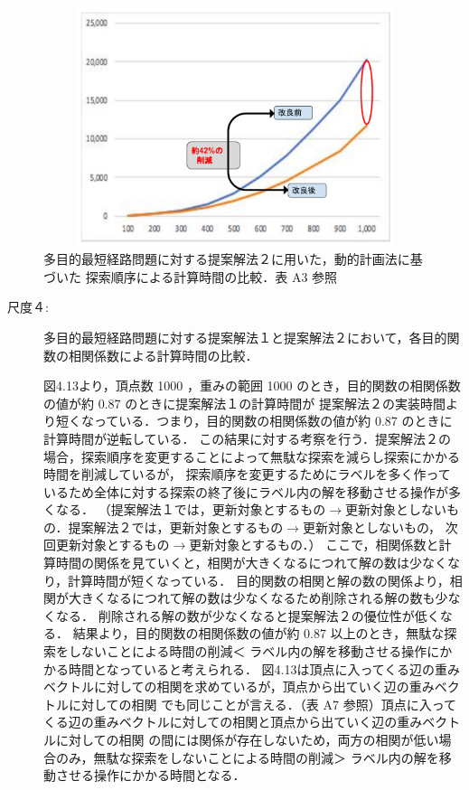 \documentclass[12pt]{optlab-bachelor}
\begin{document}
\begin{figure}[htbp]
  \centering
  \includegraphics[height=7.0cm , width=15.0cm]{fig/fig15.pdf}
  \caption{多目的最短経路問題に対する提案解法２に用いた，動的計画法に基づいた
  探索順序による計算時間の比較．表 A3 参照}
\end{figure}


\begin{description}
  \item[尺度４:]
  多目的最短経路問題に対する提案解法１と提案解法２において，各目的関数の相関係数による計算時間の比較．

  図4.13より，頂点数 1000 ，重みの範囲 1000 のとき，目的関数の相関係数の値が約 0.87 のときに提案解法１の計算時間が
  提案解法２の実装時間より短くなっている．つまり，目的関数の相関係数の値が約 0.87 のときに計算時間が逆転している．
  この結果に対する考察を行う．提案解法２の場合，探索順序を変更することによって無駄な探索を減らし探索にかかる時間を削減しているが，
  探索順序を変更するためにラベルを多く作っているため全体に対する探索の終了後にラベル内の解を移動させる操作が多くなる．
  （提案解法１では，更新対象とするもの$\rightarrow$更新対象としないもの．提案解法２では，更新対象とするもの$\rightarrow$更新対象としないもの，
  次回更新対象とするもの$\rightarrow$更新対象とするもの．）
  ここで，相関係数と計算時間の関係を見ていくと，相関が大きくなるにつれて解の数は少なくなり，計算時間が短くなっている．
  目的関数の相関と解の数の関係より，相関が大きくなるにつれて解の数は少なくなるため削除される解の数も少なくなる．
  削除される解の数が少なくなると提案解法２の優位性が低くなる．
  結果より，目的関数の相関係数の値が約 0.87 以上のとき，無駄な探索をしないことによる時間の削減＜
  ラベル内の解を移動させる操作にかかる時間となっていると考えられる．
  図4.13は頂点に入ってくる辺の重みベクトルに対しての相関を求めているが，頂点から出ていく辺の重みベクトルに対しての相関
  でも同じことが言える．（表 A7 参照）頂点に入ってくる辺の重みベクトルに対しての相関と頂点から出ていく辺の重みベクトルに対しての相関
  の間には関係が存在しないため，両方の相関が低い場合のみ，無駄な探索をしないことによる時間の削減＞
  ラベル内の解を移動させる操作にかかる時間となる．

\end{description}
\end{document}
